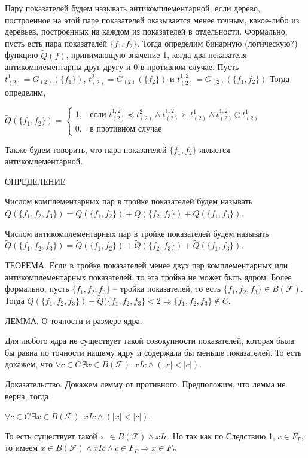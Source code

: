 \documentclass[12pt]{a&t}
\begin{document}
Пару показателей будем называть антикомплементарной, если дерево, построенное на этой паре показателей оказывается менее точным, какое-либо из деревьев, построенных на каждом из показателей в отдельности. Формально, пусть есть пара показателей $\{f_1, f_2\}$. Тогда определим бинарную (логическую?) функцию $\widetilde{Q}(f)$, принимающую значение 1, когда два показателя антикомплементарны друг другу и 0 в противном случае. Пусть $t^1_{(2)} = G_{(2)}(\{f_1\})$, $t^2_{(2)} = G_{(2)}(\{f_2\})$ и $t^{1,2}_{(2)} = G_{(2)}(\{f_1, f_2\})$ Тогда определим, 

$
\widetilde{Q}(\{f_1, f_2\}) = \begin{cases}
  1,  & \mbox{если } t^{1,2}_{(2)} \preceq t^2_{(2)} \land t^{1,2}_{(2)} \succ t^1_{(2)} \land t^{1,2}_{(2)} \odot t^1_{(2)} \\
  0, & \mbox{в противном случае }
\end{cases}
$

Также будем говорить, что пара показателей $\{f_1, f_2\}$ является антикомлементарной.

ОПРЕДЕЛЕНИЕ

Числом комплементарных пар в тройке показателей будем называть $Q(\{f_1, f_2, f_3\}) = Q(\{f_1, f_2\}) + Q(\{f_2, f_3\}) + Q(\{f_1, f_3\})$. 

Числом антикомплементарных пар в тройке показателей будем называть $\widetilde{Q}(\{f_1, f_2, f_3\}) = \widetilde{Q}(\{f_1, f_2\}) + \widetilde{Q}(\{f_2, f_3\}) + \widetilde{Q}(\{f_1, f_3\})$. 

ТЕОРЕМА. Если в тройке показателей менее двух пар комплементарных или антикомплементарных показателей, то эта тройка не может быть ядром. Более формально, пусть $\{f_1, f_2, f_3\}$ -- тройка показателей, то есть $\{f_1, f_2, f_3\} \in  B(\mathscr{F})$. Тогда  $Q(\{f_1, f_2, f_3\}) + \widetilde{Q}(\{f_1, f_2, f_3\} < 2 \Rightarrow \{f_1, f_2, f_3\} \not\in C $.

ЛЕММА. О точности и размере ядра. 

Для любого ядра не существует такой совокупности показателей, которая была бы равна по точности нашему ядру и содержала бы меньше показателей. То есть докажем, что $\forall c \in C \,  \nexists x \in B(\mathscr{F}) : xIc \land (|x| < |c|)$.


Доказательство. Докажем лемму от противного. Предположим, что лемма не верна, тогда 

$\forall c \in C \,  \exists x \in B(\mathscr{F}) : xIc \land (|x| < |c|)$.

То есть существует такой x $\in B(\mathscr{F}) \land xIc$. Но так как по Следствию 1, $c \in F_P$, то имеем  $x \in B(\mathscr{F}) \land xIc \land c \in F_P \Rightarrow x \in F_P $  
\end{document}
